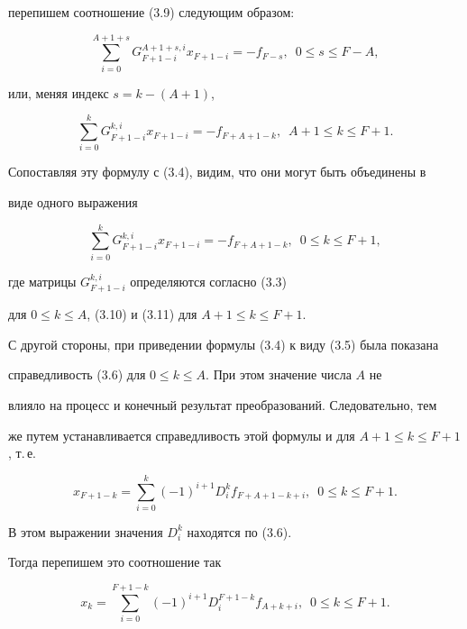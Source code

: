 перепишем соотношение (3.9) следующим образом:


$$


\sum_{i=0}^{A+1+s}G_{F+1-i}^{A+1+s,i}x_{F+1-i}=-f_{F-s},\ \;


0\leq s\leq F-A,


$$


или, меняя индекс $s=k-(A+1)$,


$$


\sum_{i=0}^{k}G_{F+1-i}^{k,i}x_{F+1-i}=-f_{F+A+1-k},\ \;


A+1\leq k\leq F+1.


$$


Сопоставляя эту формулу с (3.4), видим, что они могут быть объединены в


виде одного выражения


$$


\sum_{i=0}^{k}G_{F+1-i}^{k,i}x_{F+1-i}=-f_{F+A+1-k},\ \;


0\leq k\leq F+1,


$$


где матрицы $G_{F+1-i}^{k,i}$ определяются согласно (3.3)


для $0\leq k\leq A$, (3.10) и (3.11) для $A+1\leq k\leq F+1$.





С другой стороны, при приведении формулы (3.4) к виду (3.5) была показана


справедливость (3.6) для $0\leq k\leq A$. При этом значение числа $A$ не


влияло на процесс и конечный результат преобразований. Следовательно, тем


же  путем устанавливается справедливость этой формулы и для $A+1\leq


k\leq F+1$, т.\,е.


$$


x_{F+1-k}=\sum_{i=0}^{k}(-1)^{i+1}D_{i}^{k}f_{F+A+1-k+i},\ \; 0\leq


k\leq F+1.


$$


В этом выражении значения $D_{i}^{k}$ находятся по (3.6).


Тогда перепишем это соотношение так


\begin{equation}


x_{k}=\sum_{i=0}^{F+1-k}(-1)^{i+1}D_{i}^{F+1-k}f_{A+k+i},\ \;


0\leq k\leq F+1.


\end{equation}





